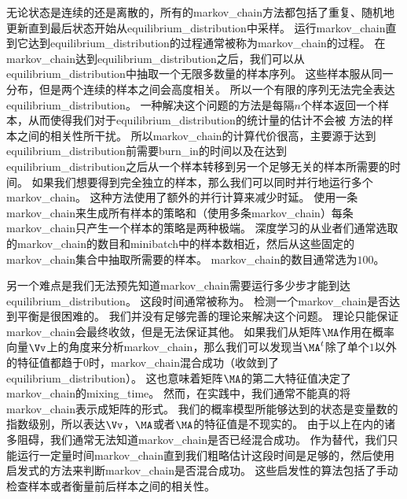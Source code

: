 无论状态是连续的还是离散的，所有的\gls{markov_chain}方法都包括了重复、随机地更新直到最后状态开始从\gls{equilibrium_distribution}中采样。 
运行\gls{markov_chain}直到它达到\gls{equilibrium_distribution}的过程通常被称为\gls{markov_chain}的过程。
在\gls{markov_chain}达到\gls{equilibrium_distribution}之后，我们可以从\gls{equilibrium_distribution}中抽取一个无限多数量的样本序列。 
这些样本服从同一分布，但是两个连续的样本之间会高度相关。 
所以一个有限的序列无法完全表达\gls{equilibrium_distribution}。
一种解决这个问题的方法是每隔$n$个样本返回一个样本，从而使得我们对于\gls{equilibrium_distribution}的统计量的估计不会被\,\,方法的样本之间的相关性所干扰。
所以\gls{markov_chain}的计算代价很高，主要源于达到\gls{equilibrium_distribution}前需要\gls{burn_in}的时间以及在达到\gls{equilibrium_distribution}之后从一个样本转移到另一个足够无关的样本所需要的时间。
如果我们想要得到完全独立的样本，那么我们可以同时并行地运行多个\gls{markov_chain}。  
这种方法使用了额外的并行计算来减少时延。 
使用一条\gls{markov_chain}来生成所有样本的策略和（使用多条\gls{markov_chain}）每条\gls{markov_chain}只产生一个样本的策略是两种极端。
深度学习的从业者们通常选取的\gls{markov_chain}的数目和\gls{minibatch}中的样本数相近，然后从这些固定的\gls{markov_chain}集合中抽取所需要的样本。 
\gls{markov_chain}的数目通常选为$100$。

另一个难点是我们无法预先知道\gls{markov_chain}需要运行多少步才能到达\gls{equilibrium_distribution}。 
这段时间通常被称为。
检测一个\gls{markov_chain}是否达到平衡是很困难的。
我们并没有足够完善的理论来解决这个问题。
理论只能保证\gls{markov_chain}会最终收敛，但是无法保证其他。
如果我们从矩阵$\MA$作用在概率向量$\Vv$上的角度来分析\gls{markov_chain}，那么我们可以发现当$\MA^t$除了单个$1$以外的特征值都趋于$0$时，\gls{markov_chain}混合成功（收敛到了\gls{equilibrium_distribution}）。
这也意味着矩阵$\MA$的第二大特征值决定了\gls{markov_chain}的\gls{mixing_time}。
然而，在实践中，我们通常不能真的将\gls{markov_chain}表示成矩阵的形式。 
我们的概率模型所能够达到的状态是变量数的指数级别，所以表达$\Vv$，$\MA$或者$\MA$的特征值是不现实的。 
由于以上在内的诸多阻碍，我们通常无法知道\gls{markov_chain}是否已经混合成功。
作为替代，我们只能运行一定量时间\gls{markov_chain}直到我们粗略估计这段时间是足够的，然后使用启发式的方法来判断\gls{markov_chain}是否混合成功。
这些启发性的算法包括了手动检查样本或者衡量前后样本之间的相关性。



\section{}
\label{sec:gibbs_sampling}

